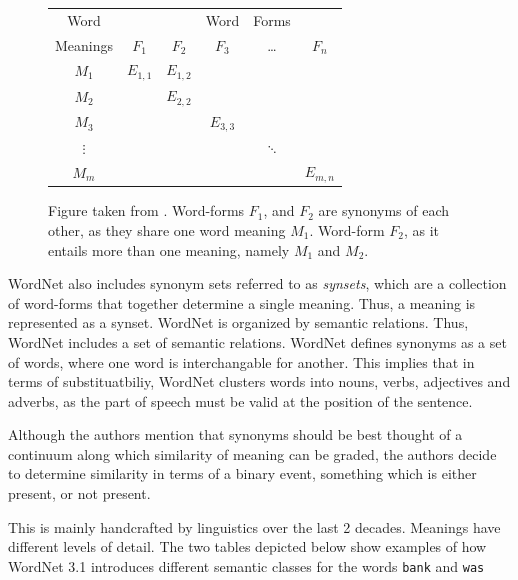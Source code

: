 \documentclass[a4paper,12pt,twoside,openright]{report}
\begin{document}

\begin{figure}[H]
\begin{center}
\begin{tabular}{ | c | c  c  c  c  c | } 
 \hline
 Word        &  &  & Word & Forms &  \\ 
 Meanings & $F_1$ & $F_2$ & $F_3$ & \ldots & $F_n$ \\ 
 \hline
 $M_1$     & $E_{1,1}$ & $E_{1,2}$ &  &  &  \\ 
 $M_2$     &  & $E_{2,2}$ &  &  &  \\ 
 $M_3$     &  &  & $E_{3, 3}$ &  &  \\ 
 $\vdots$ &  &  &  & $\ddots$ &  \\ 
 $M_m$    &  &  &  &  & $E_{m, n}$ \\ 
 \hline
\end{tabular}
\end{center}
\caption{Figure taken from \cite{miller90}. Word-forms $F_1$, and $F_2$ are synonyms of each other, as they share one word meaning $M_1$. Word-form $F_2$, as it entails more than one meaning, namely $M_1$ and $M_2$.}
\end{figure}

WordNet also includes synonym sets referred to as \textit{synsets}, which are a collection of word-forms that together determine a single meaning.
Thus, a meaning is represented as a synset.
WordNet is organized by semantic relations.
Thus, WordNet includes a set of semantic relations.
WordNet defines synonyms as a set of words, where one word is interchangable for another.
This implies that in terms of substituatbiliy, WordNet clusters words into nouns, verbs, adjectives and adverbs, as the part of speech must be valid at the position of the sentence.

Although the authors mention that synonyms should be best thought of a continuum along which similarity of meaning can be graded, the authors decide to determine similarity in terms of a binary event, something which is either present, or not present.

This is mainly handcrafted by linguistics over the last 2 decades.
Meanings have different levels of detail.
The two tables depicted below show examples of how WordNet 3.1 introduces different semantic classes for the words \Verb#bank# and \Verb#was#
\end{document}
